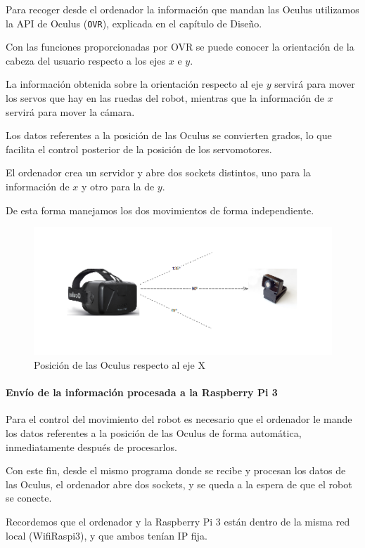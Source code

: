 \documentclass[twoside, 11pt]{epstfg}
\begin{document}
Para recoger desde el ordenador la información que mandan las Oculus utilizamos la API de Oculus (\texttt{OVR}), explicada en el capítulo de Diseño.

Con las funciones proporcionadas por OVR se puede conocer la orientación de la cabeza del usuario respecto a los ejes $x$ e $y$.

La información obtenida sobre la orientación respecto al eje $y$ servirá para mover los servos que hay en las ruedas del robot, mientras que la información de $x$ servirá para mover la cámara.

Los datos referentes a la posición de las Oculus se convierten grados, lo que facilita el control posterior de la posición de los servomotores.

El ordenador crea un servidor y abre dos sockets distintos, uno para la información de $x$ y otro para la de $y$.


De esta forma manejamos los dos movimientos de forma independiente.


\begin{figure}[h!]
	\centerline{
		\mbox{\includegraphics[width=.80\textwidth]{images/Oculusgrados2.png}}
	}
	\caption{Posición de las Oculus respecto al eje X}
\end{figure}
\newpage
\paragraph{Envío de la información procesada a la Raspberry Pi 3}


Para el control del movimiento del robot es necesario que el ordenador le mande los datos referentes a la posición de las Oculus de forma automática, inmediatamente después de procesarlos.

Con este fin, desde el mismo programa donde se recibe y procesan los datos de las Oculus, el ordenador abre dos sockets, y se queda a la espera de que el robot se conecte.

Recordemos que el ordenador y la Raspberry Pi 3 están dentro de la misma red local (WifiRaspi3), y que ambos tenían IP fija.
\end{document}
